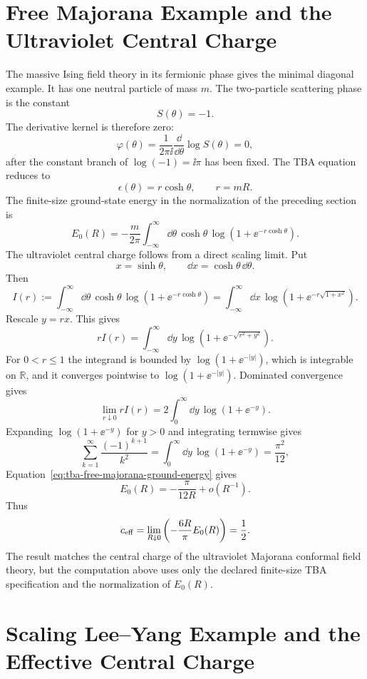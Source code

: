 \section{Free Majorana Example and the Ultraviolet Central Charge}

The massive Ising field theory in its fermionic phase gives the minimal
diagonal example.  It has one neutral particle of mass \(m\).  The two-particle
scattering phase is the constant
\[
  S(\theta)=-1 .
\]
The derivative kernel is therefore zero:
\[
  \varphi(\theta)
  =
  \frac{1}{2\pi\ii}\frac{\dd}{\dd\theta}\log S(\theta)=0,
\]
after the constant branch of \(\log(-1)=\ii\pi\) has been fixed.  The TBA
equation reduces to
\[
  \epsilon(\theta)=r\cosh\theta,
  \qquad r=mR .
\]
The finite-size ground-state energy in the normalization of the preceding
section is
\begin{equation}
  E_0(R)
  =
  -\frac{m}{2\pi}
  \int_{-\infty}^{\infty}\dd\theta\,
  \cosh\theta\,
  \log\!\left(1+\ee^{-r\cosh\theta}\right).
  \label{eq:tba-free-majorana-ground-energy}
\end{equation}
The ultraviolet central charge follows from a direct scaling limit.  Put
\[
  x=\sinh\theta,\qquad \dd x=\cosh\theta\,\dd\theta .
\]
Then
\[
  I(r)
  :=
  \int_{-\infty}^{\infty}\dd\theta\,
  \cosh\theta\,
  \log(1+\ee^{-r\cosh\theta})
  =
  \int_{-\infty}^{\infty}\dd x\,
  \log(1+\ee^{-r\sqrt{1+x^2}}).
\]
Rescale \(y=rx\).  This gives
\[
  rI(r)
  =
  \int_{-\infty}^{\infty}\dd y\,
  \log(1+\ee^{-\sqrt{r^2+y^2}}).
\]
For \(0<r\leq1\) the integrand is bounded by
\(\log(1+\ee^{-|y|})\), which is integrable on \(\mathbb R\), and it
converges pointwise to \(\log(1+\ee^{-|y|})\).  Dominated convergence gives
\[
  \lim_{r\downarrow0}rI(r)
  =
  2\int_0^\infty\dd y\,\log(1+\ee^{-y}).
\]
Expanding \(\log(1+\ee^{-y})\) for \(y>0\) and integrating termwise gives
\[
  \sum_{k=1}^{\infty}\frac{(-1)^{k+1}}{k^2}
  =
  \int_0^\infty\dd y\,\log(1+\ee^{-y})
  =
  \frac{\pi^2}{12},
\]
Equation~\eqref{eq:tba-free-majorana-ground-energy} gives
\[
  E_0(R)
  =
  -\frac{\pi}{12R}+o(R^{-1}).
\]
Thus
\[
  c_{\rm eff}
  =
  \lim_{R\downarrow0}\left(-\frac{6R}{\pi}E_0(R)\right)
  =
  \frac12 .
\]
The result matches the central charge of the ultraviolet Majorana conformal
field theory, but the computation above uses only the declared finite-size
TBA specification and the normalization of \(E_0(R)\).

\section{Scaling Lee--Yang Example and the Effective Central Charge}

